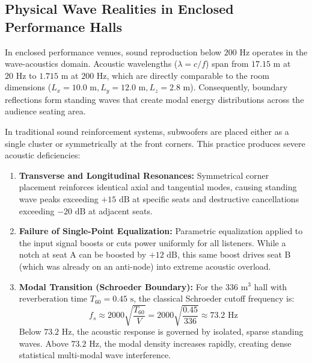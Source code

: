 \documentclass[11pt,a4paper,titlepage]{article}
\begin{document}
\subsection{Physical Wave Realities in Enclosed Performance Halls}
In enclosed performance venues, sound reproduction below $200\text{ Hz}$ operates in the wave-acoustics domain. Acoustic wavelengths ($\lambda = c / f$) span from $17.15\text{ m}$ at $20\text{ Hz}$ to $1.715\text{ m}$ at $200\text{ Hz}$, which are directly comparable to the room dimensions ($L_x = 10.0\text{ m}, L_y = 12.0\text{ m}, L_z = 2.8\text{ m}$). Consequently, boundary reflections form standing waves that create modal energy distributions across the audience seating area.

In traditional sound reinforcement systems, subwoofers are placed either as a single cluster or symmetrically at the front corners. This practice produces severe acoustic deficiencies:
\begin{enumerate}
    \item \textbf{Transverse and Longitudinal Resonances:} Symmetrical corner placement reinforces identical axial and tangential modes, causing standing wave peaks exceeding $+15\text{ dB}$ at specific seats and destructive cancellations exceeding $-20\text{ dB}$ at adjacent seats.
    \item \textbf{Failure of Single-Point Equalization:} Parametric equalization applied to the input signal boosts or cuts power uniformly for all listeners. While a notch at seat A can be boosted by $+12\text{ dB}$, this same boost drives seat B (which was already on an anti-node) into extreme acoustic overload.
    \item \textbf{Modal Transition (Schroeder Boundary):} For the $336\text{ m}^3$ hall with reverberation time $T_{60} = 0.45\text{ s}$, the classical Schroeder cutoff frequency is:
    \begin{equation}
        f_s \approx 2000 \sqrt{\frac{T_{60}}{V}} = 2000 \sqrt{\frac{0.45}{336}} \approx 73.2\text{ Hz}
    \end{equation}
    Below $73.2\text{ Hz}$, the acoustic response is governed by isolated, sparse standing waves. Above $73.2\text{ Hz}$, the modal density increases rapidly, creating dense statistical multi-modal wave interference.
\end{enumerate}
\end{document}
